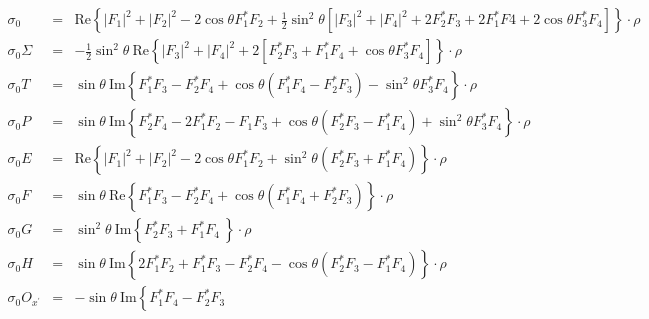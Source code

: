 \documentclass[a4paper,10pt]{article}
\def\cc{^*}
\def\Re{\mathrm{Re}}
\def\Im{\mathrm{Im}}
\begin{document}
\begin{displaymath}\label{frm_Obs}
\begin{array}{lll}
\sigma_0 & = & \Re \left\lbrace |F_1|^2 + |F_2|^2 - 2\cos\theta F_1\cc F_2  + \frac{1}{2}\sin^2\theta\left[ |F_3|^2 + |F_4|^2 + 2 F_2\cc  F_3    + 2 F_1\cc  F4 + 2\cos\theta F_3\cc F_4\right] \right\rbrace \cdot \rho\\
\sigma_0 \Sigma& = & - \frac{1}{2}\sin^2\theta\:\Re\left\lbrace|F_3|^2 + |F_4|^2 
                                               + 2\left[F_2\cc F_3 + F_1\cc F_4 
                                               + \cos\theta F_3\cc F_4\right]  
                                               \right\rbrace \cdot \rho\\
\sigma_0 T     & = & \sin\theta\:\Im \left\lbrace F_1\cc F_3 - F_2\cc F_4 
                                               + \cos\theta\left(F_1\cc F_4 - F_2\cc F_3\right)
                                               - \sin^2\theta F_3\cc F_4
                                               \right\rbrace \cdot \rho\\
\sigma_0 P     & = & \sin\theta\: \Im\left\lbrace F_2\cc F_4 - 2 F_1\cc F_2 - F_1 F_3
                                               + \cos\theta\left(F_2\cc F_3 - F_1\cc F_4\right) 
                                               + \sin^2\theta F_3\cc F_4
                                               \right\rbrace \cdot \rho\\
\sigma_0 E     & = & \Re\left\lbrace|F_1|^2 + |F_2|^2 - 2\cos\theta F_1\cc F_2
                                               +\sin^2\theta\left(F_2\cc F_3 + F_1\cc F_4\right)
                                               \right\rbrace \cdot \rho\\
\sigma_0 F     & = & \sin\theta \:\Re\left\lbrace F_1\cc F_3 - F_2\cc F_4 
                                               + \cos\theta\left(F_1\cc F_4 + F_2\cc F_3\right)
                                                 \right\rbrace \cdot \rho\\
\sigma_0 G     & = & \sin^2\theta \:\Im\left\lbrace F_2\cc F_3 + F_1\cc F_4\:
                                                \right\rbrace \cdot \rho\\
\sigma_0 H\,     & = & \sin\theta \:\Im \left\lbrace 2 F_1\cc F_2 + F_1\cc F_3 
                                               - F_2\cc F_4 -\cos\theta\left( F_2\cc F_3 - F_1\cc F_4 \right)
                                                 \right\rbrace \cdot \rho\\
\sigma_0 O_{x^\prime} & = & -\sin\theta \:\Im \left\lbrace F_1\cc F_4 - F_2\cc F_3

\end{array}
\end{displaymath}
\end{document}
